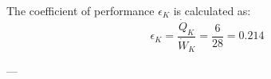 The coefficient of performance \( \epsilon_K \) is calculated as:  
\[
\epsilon_K = \frac{\dot{Q}_K}{\dot{W}_K} = \frac{6}{28} = 0.214
\]

---